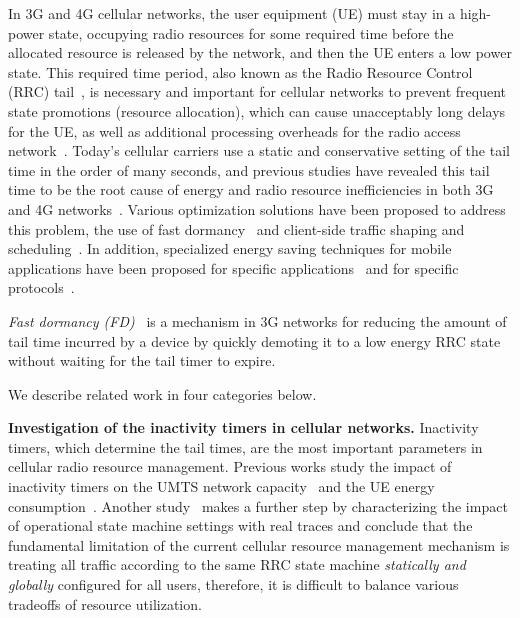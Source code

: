 In 3G and 4G cellular networks, the user equipment (UE) must stay in a high-power state, occupying radio resources for some required time before the allocated resource is released by the network, and then the UE enters a low power state. This required time period, also known as the Radio Resource Control (RRC) tail~\cite{imc.tailender}, is necessary and important for cellular networks to prevent frequent state promotions (resource allocation), which can cause unacceptably long delays for the UE, as well as additional processing overheads for the radio access network~\cite{poor, infocom_lee}. Today's cellular carriers use a static and conservative setting of the tail time in the order of many seconds, and previous studies have revealed this tail time to be the root cause of energy and radio resource inefficiencies in both 3G~\cite{imc.3g, imc.tailender, wts04, Chuah:Impacts:WCNC2002} and 4G networks~\cite{huang12_mobisys}. Various optimization solutions have been proposed to address this problem, \eg the use of fast dormancy~\cite{fast.dormancy.1, fast.dormancy.2, qian10_icnp} and client-side traffic shaping and scheduling~\cite{qian12_www, mobisys10_ra, imc.tailender}. In addition, specialized energy saving techniques for mobile applications have been proposed for specific applications~\cite{mobisys09_wang, mobisys08_kang} and for specific protocols~\cite{mobisys07_agarwal}.


{\em  Fast dormancy (FD)}~\cite{fast.dormancy.1, fast.dormancy.2} is a mechanism in 3G networks for reducing the amount of tail time incurred by a device by quickly demoting it to a low energy RRC state without waiting for the tail timer to expire.






We describe related work in four categories below.

\textbf{Investigation of the inactivity timers in cellular networks.} Inactivity timers, which determine the tail times, are the most important parameters in cellular radio resource management. Previous works study the impact of inactivity timers on the UMTS network capacity~\cite{Chuah:Impacts:WCNC2002} and the UE energy consumption~\cite{Lee:Impact:WTS2004, Yeh:Energy:ITVT2009}.
Another study~\cite{imc.3g} makes a further step by characterizing the impact of operational state machine settings with real traces and conclude that the fundamental limitation of the current cellular resource management mechanism is treating all traffic according to the same RRC state machine \emph{statically and globally} configured for all users, therefore, it is difficult to balance various tradeoffs of resource utilization.

